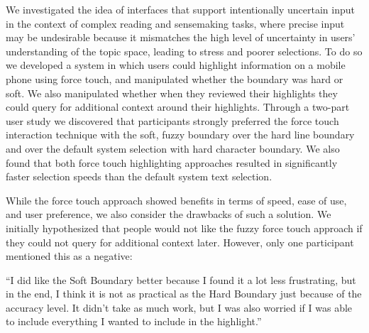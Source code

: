 We investigated the idea of interfaces that support intentionally uncertain input in the context of complex reading and sensemaking tasks, where precise input may be undesirable because it mismatches the high level of uncertainty in users' understanding of the topic space, leading to stress and poorer selections. To do so we developed a system in which users could highlight information on a mobile phone using force touch, and manipulated whether the boundary was hard or soft.  We also manipulated whether when they reviewed their highlights they could query for additional context around their highlights. Through a two-part user study we discovered that participants strongly preferred the force touch interaction technique with the soft, fuzzy boundary over the hard line boundary and over the default system selection with hard character boundary. We also found that both force touch highlighting approaches resulted in significantly faster selection speeds than the default system text selection.


While the force touch approach showed benefits in terms of speed, ease of use, and user preference, we also consider the drawbacks of such a solution.  We initially hypothesized that people would not like the fuzzy force touch approach if they could not query for additional context later. However, only one participant mentioned this as a negative:

``I did like the Soft Boundary better because I found it a lot less frustrating, but in the end, I think it is not as practical as the Hard Boundary just because of the accuracy level. It didn't take as much work, but I was also worried if I was able to include everything I wanted to include in the highlight.''

